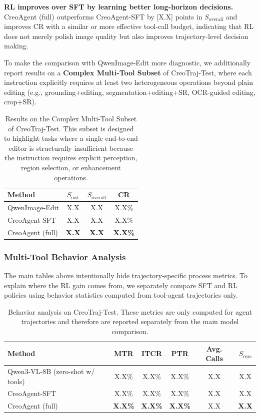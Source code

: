 \documentclass[11pt]{article}
\begin{document}
\textbf{RL improves over SFT by learning better long-horizon decisions.} CreoAgent (full) outperforms CreoAgent-SFT by [X.X] points in $S_{\text{overall}}$ and improves CR with a similar or more effective tool-call budget, indicating that RL does not merely polish image quality but also improves trajectory-level decision making.

To make the comparison with QwenImage-Edit more diagnostic, we additionally report results on a \textbf{Complex Multi-Tool Subset} of CreoTraj-Test, where each instruction explicitly requires at least two heterogeneous operations beyond plain editing (e.g., grounding+editing, segmentation+editing+SR, OCR-guided editing, crop+SR).

\begin{table}[t]
\centering
\caption{Results on the Complex Multi-Tool Subset of CreoTraj-Test. This subset is designed to highlight tasks where a single end-to-end editor is structurally insufficient because the instruction requires explicit perception, region selection, or enhancement operations.}
\label{tab:complex_subset}
\begin{tabular}{lccc}
\toprule
\textbf{Method} & $S_{\text{inst}}$ & $S_{\text{overall}}$ & CR \\
\midrule
QwenImage-Edit & X.X & X.X & X.X\% \\
CreoAgent-SFT & X.X & X.X & X.X\% \\
CreoAgent (full) & \textbf{X.X} & \textbf{X.X} & \textbf{X.X\%} \\
\bottomrule
\end{tabular}
\end{table}


\subsubsection{Multi-Tool Behavior Analysis}

The main tables above intentionally hide trajectory-specific process metrics. To explain where the RL gain comes from, we separately compare SFT and RL policies using behavior statistics computed from tool-agent trajectories only.

\begin{table}[t]
\centering
\caption{Behavior analysis on CreoTraj-Test. These metrics are only computed for agent trajectories and therefore are reported separately from the main model comparison.}
\label{tab:behavior_analysis}
\begin{tabular}{lccccc}
\toprule
\textbf{Method} & MTR & ITCR & PTR & Avg. Calls & $S_{\text{reas}}$ \\
\midrule
Qwen3-VL-8B (zero-shot w/ tools) & X.X\% & X.X\% & X.X\% & X.X & X.X \\
CreoAgent-SFT & X.X\% & X.X\% & X.X\% & X.X & X.X \\
CreoAgent (full) & \textbf{X.X\%} & \textbf{X.X\%} & \textbf{X.X\%} & X.X & \textbf{X.X} \\
\bottomrule
\end{tabular}
\end{table}
\end{document}
